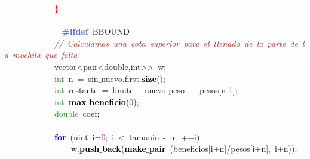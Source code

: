 \mbox{}\ \ \ \ \ \ \ \ \ \ \ \ \textcolor{Red}{\}} \\
\mbox{}\ \ \ \ \ \ \ \ \ \ \ \  \\
\mbox{}\textbf{\textcolor{RoyalBlue}{\ \ \ \ \ \ \ \ \ \ \ \ \#ifdef}}\ BBOUND \\
\mbox{}\ \ \ \ \ \ \ \ \ \ \ \ \textit{\textcolor{Brown}{//\ Calculamos\ una\ cota\ superior\ para\ el\ llenado\ de\ la\ parte\ de\ la\ mochila\ que\ falta}} \\
\mbox{}\ \ \ \ \ \ \ \ \ \ \ \ \textcolor{TealBlue}{vector\textless{}pair\textless{}double,int\textgreater{}\textgreater{}}\ w\textcolor{BrickRed}{;} \\
\mbox{}\ \ \ \ \ \ \ \ \ \ \ \ \textcolor{ForestGreen}{int}\ n\ \textcolor{BrickRed}{=}\ sin$\_$nuevo\textcolor{BrickRed}{.}first\textcolor{BrickRed}{.}\textbf{\textcolor{Black}{size}}\textcolor{BrickRed}{();} \\
\mbox{}\ \ \ \ \ \ \ \ \ \ \ \ \textcolor{ForestGreen}{int}\ restante\ \textcolor{BrickRed}{=}\ limite\ \textcolor{BrickRed}{-}\ nuevo$\_$peso\ \textcolor{BrickRed}{+}\ pesos\textcolor{BrickRed}{[}n\textcolor{BrickRed}{-}\textcolor{Purple}{1}\textcolor{BrickRed}{];} \\
\mbox{}\ \ \ \ \ \ \ \ \ \ \ \ \textcolor{ForestGreen}{int}\ \textbf{\textcolor{Black}{max$\_$beneficio}}\textcolor{BrickRed}{(}\textcolor{Purple}{0}\textcolor{BrickRed}{);} \\
\mbox{}\ \ \ \ \ \ \ \ \ \ \ \ \textcolor{ForestGreen}{double}\ coef\textcolor{BrickRed}{;} \\
\mbox{}\ \ \ \ \ \ \ \ \ \ \ \ \ \ \ \  \\
\mbox{}\ \ \ \ \ \ \ \ \ \ \ \ \textbf{\textcolor{Blue}{for}}\ \textcolor{BrickRed}{(}\textcolor{TealBlue}{uint}\ i\textcolor{BrickRed}{=}\textcolor{Purple}{0}\textcolor{BrickRed}{;}\ i\ \textcolor{BrickRed}{\textless{}}\ tamanio\ \textcolor{BrickRed}{-}\ n\textcolor{BrickRed}{;}\ \textcolor{BrickRed}{++}i\textcolor{BrickRed}{)}\ \ \ \ \ \ \ \ \ \ \ \ \ \ \ \  \\
\mbox{}\ \ \ \ \ \ \ \ \ \ \ \ \ \ \ \ w\textcolor{BrickRed}{.}\textbf{\textcolor{Black}{push$\_$back}}\textcolor{BrickRed}{(}\textbf{\textcolor{Black}{make$\_$pair}}\ \textcolor{BrickRed}{(}beneficios\textcolor{BrickRed}{[}i\textcolor{BrickRed}{+}n\textcolor{BrickRed}{]/}pesos\textcolor{BrickRed}{[}i\textcolor{BrickRed}{+}n\textcolor{BrickRed}{],}\ i\textcolor{BrickRed}{+}n\textcolor{BrickRed}{));} \\
\mbox{}\ \ \ \ \ \ \ \ \ \ \ \ \ \ \ \  \\
